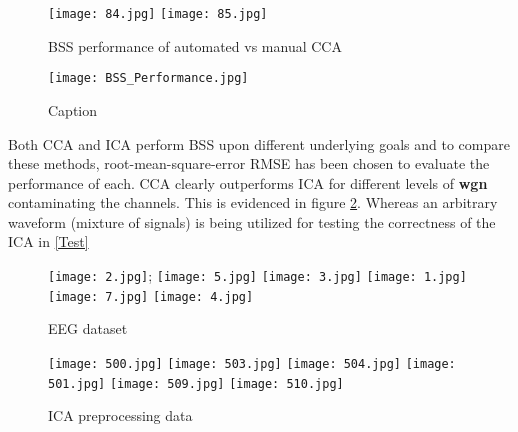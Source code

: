 \begin{figure}[!htbp]
%
\centering
\texttt{[image: 84.jpg]}
\label{SAR}
\endminipage\hfill
{}%
\centering
\texttt{[image: 85.jpg]}
\label{SDR}
\endminipage\hfill
\caption{BSS performance of automated vs manual CCA}\label{Perfor2}
\end{figure}


\begin{figure}
    \centering
    \texttt{[image: BSS\_Performance.jpg]}
    \caption{Caption}
    \label{BSSPerformance}
\end{figure}


Both CCA and ICA perform BSS upon different underlying goals and to compare these methods, root-mean-square-error RMSE has been chosen to evaluate the performance of each. CCA clearly outperforms ICA for different levels of \textbf{wgn} contaminating the channels. This is evidenced in figure \ref{BSSPerformance}. Whereas an arbitrary waveform (mixture of signals) is being utilized for testing the correctness of the ICA in \ref{Test}

\begin{figure}[!htbp]
%
\centering
{\texttt{[image: 2.jpg]}};
\label{Nadya1}
\texttt{[image: 5.jpg]}
\label{Nadya5}
\texttt{[image: 3.jpg]}
\label{Nadya4}
\endminipage\hfill
{}%
\centering
\texttt{[image: 1.jpg]}
\label{Nadya2}
\texttt{[image: 7.jpg]}
\label{Nadya8}
\texttt{[image: 4.jpg]}
\label{Nadya3}
\endminipage\hfill
\caption{EEG dataset}
\end{figure}



\begin{figure}[!htbp]
%
\centering
\texttt{[image: 500.jpg]}
\label{Kurtosis1}
\texttt{[image: 503.jpg]}
\label{center1}
\texttt{[image: 504.jpg]}
\label{whited1}
\endminipage\hfill
{}%
\centering
\texttt{[image: 501.jpg]}
\label{Kurtosis2}
\texttt{[image: 509.jpg]}
\label{center2}
\texttt{[image: 510.jpg]}
\label{whited2}
\endminipage\hfill
\caption{ICA preprocessing data}
\end{figure}



